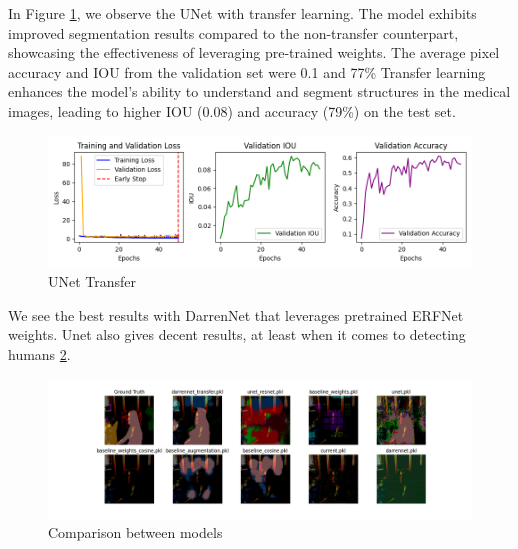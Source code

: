 In Figure \ref{fig:unet_transfer}, we observe the UNet with transfer learning. The model exhibits improved segmentation results compared to the non-transfer counterpart, showcasing the effectiveness of leveraging pre-trained weights. The average pixel accuracy and IOU from the validation set were 0.1 and 77\% Transfer learning enhances the model's ability to understand and segment structures in the medical images, leading to higher IOU (0.08) and accuracy (79\%) on the test set.

\begin{figure}[H]
	\centering
	\includegraphics[width=\textwidth]{plots/unet_transfer}
	\caption{UNet Transfer}
	\label{fig:unet_transfer}
\end{figure}


We see the best results with DarrenNet that leverages pretrained ERFNet weights. Unet also
gives decent results, at least when it comes to detecting humans \ref{fig:comparison}.

\begin{figure}[H]
	\centering
	\includegraphics[width=\textwidth]{plots/comparison}
	\caption{Comparison between models}
	\label{fig:comparison}
\end{figure}
